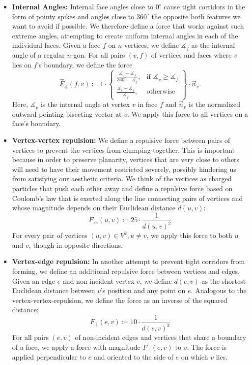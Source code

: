 \begin{itemize}
	\item \textbf{Internal Angles:}
	Internal face angles close to $0^\circ$ cause tight corridors in the form of pointy spikes and angles close to $360^\circ$ the opposite \emdash{} both features we want to avoid if possible. We therefore define a force that works against such extreme angles, attempting to create uniform internal angles in each of the individual faces. Given a face $f$ on $n$ vertices, we define $\measuredangle_f$ as the internal angle of a regular $n$-gon. For all pairs $(v,f)$ of vertices and faces where $v$ lies on $f$'s boundary, we define the force
	\begin{equation}
		\vec{F}_\measuredangle(f,v) \coloneqq 1 \cdot \left\{\begin{array}{lr}
			\frac{\measuredangle_v - \measuredangle_f}{360^\circ - \measuredangle_f}, & \text{if } \measuredangle_v \geq \measuredangle_f\\
			\frac{\measuredangle_v - \measuredangle_f}{\measuredangle_f}, & \text{otherwise}\end{array}
		\right\} \cdot \vec{n}_v.
	\end{equation}
	Here, $\measuredangle_v$ is the internal angle at vertex $v$ in face $f$ and $\vec{n}_v$ is the normalized outward-pointing bisecting vector at $v$. We apply this force to all vertices on a face's boundary.

	\item \textbf{Vertex-vertex repulsion:}
	We define a repulsive force between pairs of vertices to prevent the vertices from clumping together. This is important because in order to preserve planarity, vertices that are very close to others will need to have their movement restricted severely, possibly hindering us from satisfying our aesthetic criteria. We think of the vertices as charged particles that push each other away and define a repulsive force based on Coulomb's law that is exerted along the line connecting pairs of vertices and whose magnitude depends on their Euclidean distance $d(u,v)$:
	\begin{equation}
		F_\leftrightarrow(u,v) \coloneqq 25 \cdot \frac{1}{d(u,v)^2}
	\end{equation}
	For every pair of vertices $(u, v) \in V^2, u \neq v$, we apply this force to both $u$ and $v$, though in opposite directions.

	\item \textbf{Vertex-edge repulsion:}
	In another attempt to prevent tight corridors from forming, we define an additional repulsive force between vertices and edges. Given an edge $e$ and non-incident vertex $v$, we define $d(e,v)$ as the shortest Euclidean distance between $v$'s position and any point on $e$. Analogous to the vertex-vertex-repulsion, we define the force as an inverse of the squared distance:
	\begin{equation}
		F_\bot(e,v) \coloneqq 10 \cdot \frac{1}{d(e,v)^2}
	\end{equation}
	For all pairs $(e,v)$ of non-incident edges and vertices that share a boundary of a face, we apply a force with magnitude $F_\bot(e,v)$ to $v$. The force is applied perpendicular to $e$ and oriented to the side of $e$ on which $v$ lies.
\end{itemize}

